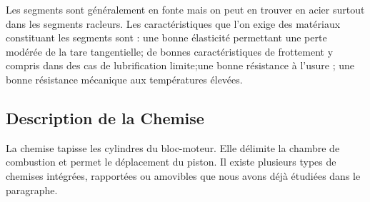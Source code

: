 Les segments sont généralement en fonte mais on peut en trouver en acier surtout dans les segments racleurs. Les caractéristiques que l’on exige des matériaux constituant les segments sont : une bonne élasticité permettant une perte modérée de la tare tangentielle; de bonnes caractéristiques de frottement y compris dans des cas de lubrification limite;une bonne résistance à l’usure ; une bonne résistance mécanique aux températures élevées.\\

\subsection{Description de la Chemise}
La chemise tapisse les cylindres du bloc-moteur. Elle délimite la chambre de combustion et permet le déplacement du piston. Il existe plusieurs types de chemises intégrées, rapportées ou amovibles que nous avons déjà étudiées dans le paragraphe. \cite{technologie1}\\

